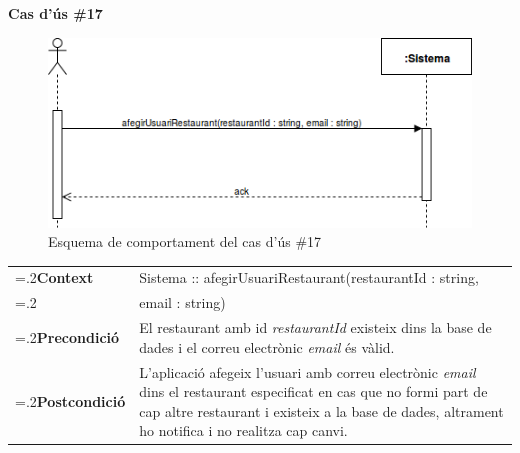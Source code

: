 \clearpage
\noindent\textbf{\large Cas d'ús \#17}\\
\begin{figure}[H]
\centering
\includegraphics[scale=0.6]{Figures/casdus_17.png}
\caption{Esquema de comportament del cas d'ús \#17}
\end{figure}
\begin{table}[h]
\noindent
\begin{tabularx}{\linewidth}{
>{\hsize=.2\hsize}X%
>{\hsize=0.8\hsize}X%
}
\textbf{Context} 		& Sistema :: afegirUsuariRestaurant(restaurantId : string,\\
						& email : string) \\
\textbf{Precondició} 	& El restaurant amb id \textit{restaurantId} existeix dins la base de dades i el correu electrònic \textit{email} és vàlid. \\
\textbf{Postcondició}	& L'aplicació afegeix l'usuari amb correu electrònic \textit{email} dins el restaurant especificat en cas que no formi part de cap altre restaurant i existeix a la base de dades, altrament ho notifica i no realitza cap canvi. \\
\end{tabularx}
\label{}
\end{table}

